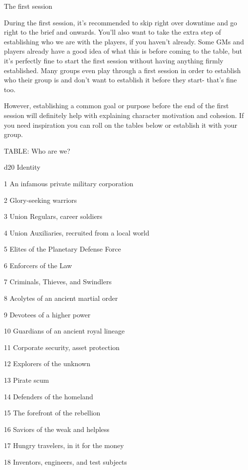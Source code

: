                                                 The first session

During the first session, it’s recommended to skip right over downtime and go right to the brief
and onwards. You’ll also want to take the extra step of establishing who we are with the players,
if you haven’t already. Some GMs and players already have a good idea of what this is before
coming to the table, but it’s perfectly fine to start the first session without having anything firmly
established. Many groups even play through a first session in order to establish who their group
is and don’t want to establish it before they start- that’s fine too.

However, establishing a common goal or purpose before the end of the first session will definitely
help with explaining character motivation and cohesion. If you need inspiration you can roll on
the tables below or establish it with your group.

TABLE: Who are we?

 d20       Identity

 1         An infamous private military corporation

 2         Glory-seeking warriors

 3         Union Regulars, career soldiers

 4         Union Auxiliaries, recruited from a local world

 5         Elites of the Planetary Defense Force

 6         Enforcers of the Law

 7         Criminals, Thieves, and Swindlers

 8         Acolytes of an ancient martial order

 9         Devotees of a higher power

  10       Guardians of an ancient royal lineage

  11       Corporate security, asset protection

  12       Explorers of the unknown

  13       Pirate scum

  14       Defenders of the homeland

  15       The forefront of the rebellion

  16       Saviors of the weak and helpless

  17       Hungry travelers, in it for the money

  18       Inventors, engineers, and test subjects

